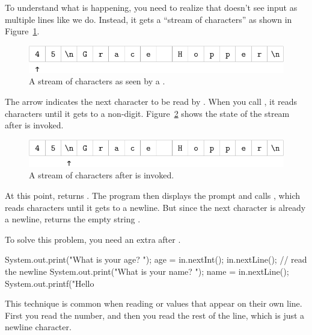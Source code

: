 To understand what is happening, you need to realize that  doesn't see input as multiple lines like we do.
Instead, it gets a ``stream of characters'' as shown in Figure~\ref{fig.hopper1}.

\begin{figure}[!ht]
\begin{center}
\includegraphics{figs/hopper1.pdf}
\caption{A stream of characters as seen by a .}
\label{fig.hopper1}
\end{center}
\end{figure}


The arrow indicates the next character to be read by .
When you call , it reads characters until it gets to a non-digit.
Figure~\ref{fig.hopper2} shows the state of the stream after  is invoked.

\begin{figure}[!ht]
\begin{center}
\includegraphics{figs/hopper2.pdf}
\caption{A stream of characters after  is invoked.}
\label{fig.hopper2}
\end{center}
\end{figure}

At this point,  returns .
The program then displays the prompt  and calls , which reads characters until it gets to a newline.
But since the next character is already a newline,  returns the empty string .

To solve this problem, you need an extra  after .

\begin{code}
System.out.print("What is your age? ");
age = in.nextInt();
in.nextLine();  // read the newline
System.out.print("What is your name? ");
name = in.nextLine();
System.out.printf("Hello %
\end{code}

This technique is common when reading  or  values that appear on their own line.
First you read the number, and then you read the rest of the line, which is just a newline character.


